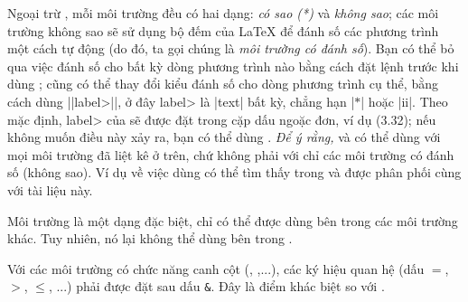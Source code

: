 Ngoại trừ , mỗi môi trường đều có hai dạng:
\emph{có sao (*)} và \emph{không sao};
các môi trường không sao sẽ sử dụng bộ đếm  của \LaTeX{}
để đánh số các phương trình một cách tự động (do đó, ta gọi
chúng là \emph{môi trường có đánh số}).
Bạn có thể bỏ qua việc đánh số cho bất kỳ dòng phương trình nào
bằng cách đặt lệnh  trước khi dùng \cn{\\};
cũng có thể thay đổi kiểu đánh số cho dòng phương trình cụ thể, bằng
cách dùng |{|\<label>|}|, ở đây \<label> là |text| bất kỳ,
chẳng hạn |$*$| hoặc |ii|. Theo mặc định, \<label> của  sẽ được
đặt trong cặp dấu ngoặc đơn, ví dụ (3.32);
nếu không muốn điều này xảy ra, bạn có thể dùng .
\emph{Để ý rằng,}
 và  có thể dùng với mọi môi trường đã liệt kê ở trên,
chứ không phải với chỉ các môi trường có đánh số (không sao).
Ví dụ về việc dùng  có thể tìm thấy trong 
và  được phân phối cùng với tài liệu này.

\medskip
Môi trường  là một dạng đặc biệt, chỉ có thể được dùng
bên trong các môi trường khác. Tuy nhiên, nó lại không thể dùng bên
trong .

\medskip
Với các môi trường có chức năng canh cột (, ,...),
các ký hiệu quan hệ (dấu $=$, $>$, $\le$, ...) phải được đặt sau dấu \verb'&'.
Đây là điểm khác biệt so với .

